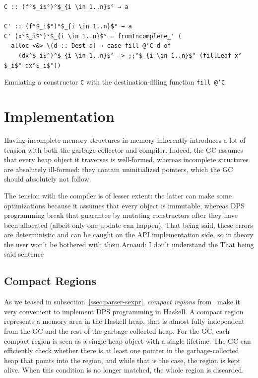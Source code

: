 \documentclass[english]{jflart}
\newcommand{\TODO}[1]{{\color{red}\large #1}}
\begin{document}
\begin{table}[t]
\small
\begin{verbatim}
C :: (f°$_i$°)°$_{i \in 1..n}$° → a

C' :: (f°$_i$°)°$_{i \in 1..n}$° → a
C' (x°$_i$°)°$_{i \in 1..n}$° = fromIncomplete_' (
  alloc <&> \(d :: Dest a) → case fill @'C d of
    (dx°$_i$°)°$_{i \in 1..n}$° -> ;;°$_{i \in 1..n}$° (fillLeaf x°$_i$° dx°$_i$°))
\end{verbatim}
\caption{Emulating a constructor \texttt{C} with the destination-filling function \texttt{fill @'C}}
\label{table:emulate-ctor}
\end{table}

\section{Implementation}\label{sec:implementation}

Having incomplete memory structures in memory inherently introduces a lot of tension with both the garbage collector and compiler. Indeed, the GC assumes that every heap object it traverses is well-formed, whereas incomplete structures are absolutely ill-formed: they contain uninitialized pointers, which the GC should absolutely not follow.

The tension with the compiler is of lesser extent: the latter can make some optimizations because it assumes that every object is immutable, whereas DPS programming break that guarantee by mutating constructors after they have been allocated (albeit only one update can happen). That being said, these errors are deterministic and can be caught on the API implementation side, so in theory the user won't be bothered with them.\TODO{Arnaud: I don't understand the That being said sentence}

\subsection{Compact Regions}\label{ssec:impl-compact-regions}

As we teased in subsection~\ref{ssec:parser-sexpr}, \emph{compact regions} from~\cite{yang_efficient_2015} make it very convenient to implement DPS programming in 
Haskell. A compact region represents a memory area in the Haskell heap, that is almost fully independent from the GC and the rest of the garbage-collected heap. For the GC, each compact region is seen as a single heap object with a single lifetime. The GC can efficiently check whether there is at least one pointer in the garbage-collected heap that points into the region, and while that is the case, the region is kept alive. When this condition is no longer matched, the whole region is discarded.
\end{document}
